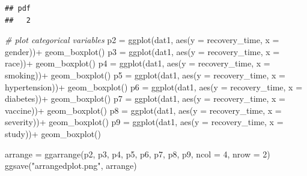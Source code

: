 \documentclass[
]{article}
\newenvironment{Shaded}{\begin{snugshade}}{\end{snugshade}}
\newcommand{\AttributeTok}[1]{\textcolor[rgb]{0.77,0.63,0.00}{#1}}
\newcommand{\CommentTok}[1]{\textcolor[rgb]{0.56,0.35,0.01}{\textit{#1}}}
\newcommand{\DecValTok}[1]{\textcolor[rgb]{0.00,0.00,0.81}{#1}}
\newcommand{\FunctionTok}[1]{\textcolor[rgb]{0.00,0.00,0.00}{#1}}
\newcommand{\NormalTok}[1]{#1}
\newcommand{\OtherTok}[1]{\textcolor[rgb]{0.56,0.35,0.01}{#1}}
\newcommand{\SpecialCharTok}[1]{\textcolor[rgb]{0.00,0.00,0.00}{#1}}
\newcommand{\StringTok}[1]{\textcolor[rgb]{0.31,0.60,0.02}{#1}}
\begin{document}
\begin{verbatim}
## pdf 
##   2
\end{verbatim}

\begin{Shaded}
\begin{Highlighting}[]
\CommentTok{\# plot categorical variables}
\NormalTok{p2 }\OtherTok{=} \FunctionTok{ggplot}\NormalTok{(dat1, }\FunctionTok{aes}\NormalTok{(}\AttributeTok{y =}\NormalTok{ recovery\_time, }\AttributeTok{x =}\NormalTok{ gender))}\SpecialCharTok{+}
  \FunctionTok{geom\_boxplot}\NormalTok{()}
\NormalTok{p3 }\OtherTok{=} \FunctionTok{ggplot}\NormalTok{(dat1, }\FunctionTok{aes}\NormalTok{(}\AttributeTok{y =}\NormalTok{ recovery\_time, }\AttributeTok{x =}\NormalTok{ race))}\SpecialCharTok{+}
  \FunctionTok{geom\_boxplot}\NormalTok{()}
\NormalTok{p4 }\OtherTok{=} \FunctionTok{ggplot}\NormalTok{(dat1, }\FunctionTok{aes}\NormalTok{(}\AttributeTok{y =}\NormalTok{ recovery\_time, }\AttributeTok{x =}\NormalTok{ smoking))}\SpecialCharTok{+}
  \FunctionTok{geom\_boxplot}\NormalTok{()}
\NormalTok{p5 }\OtherTok{=} \FunctionTok{ggplot}\NormalTok{(dat1, }\FunctionTok{aes}\NormalTok{(}\AttributeTok{y =}\NormalTok{ recovery\_time, }\AttributeTok{x =}\NormalTok{ hypertension))}\SpecialCharTok{+}
  \FunctionTok{geom\_boxplot}\NormalTok{()}
\NormalTok{p6 }\OtherTok{=} \FunctionTok{ggplot}\NormalTok{(dat1, }\FunctionTok{aes}\NormalTok{(}\AttributeTok{y =}\NormalTok{ recovery\_time, }\AttributeTok{x =}\NormalTok{ diabetes))}\SpecialCharTok{+}
  \FunctionTok{geom\_boxplot}\NormalTok{()}
\NormalTok{p7 }\OtherTok{=} \FunctionTok{ggplot}\NormalTok{(dat1, }\FunctionTok{aes}\NormalTok{(}\AttributeTok{y =}\NormalTok{ recovery\_time, }\AttributeTok{x =}\NormalTok{ vaccine))}\SpecialCharTok{+}
  \FunctionTok{geom\_boxplot}\NormalTok{()}
\NormalTok{p8 }\OtherTok{=} \FunctionTok{ggplot}\NormalTok{(dat1, }\FunctionTok{aes}\NormalTok{(}\AttributeTok{y =}\NormalTok{ recovery\_time, }\AttributeTok{x =}\NormalTok{ severity))}\SpecialCharTok{+}
  \FunctionTok{geom\_boxplot}\NormalTok{()}
\NormalTok{p9 }\OtherTok{=} \FunctionTok{ggplot}\NormalTok{(dat1, }\FunctionTok{aes}\NormalTok{(}\AttributeTok{y =}\NormalTok{ recovery\_time, }\AttributeTok{x =}\NormalTok{ study))}\SpecialCharTok{+}
  \FunctionTok{geom\_boxplot}\NormalTok{()}

\NormalTok{arrange }\OtherTok{=} \FunctionTok{ggarrange}\NormalTok{(p2, p3, p4, p5, p6, p7, p8, p9, }\AttributeTok{ncol =} \DecValTok{4}\NormalTok{, }\AttributeTok{nrow =} \DecValTok{2}\NormalTok{)}
\FunctionTok{ggsave}\NormalTok{(}\StringTok{"arrangedplot.png"}\NormalTok{, arrange)}
\end{Highlighting}
\end{Shaded}
\end{document}
